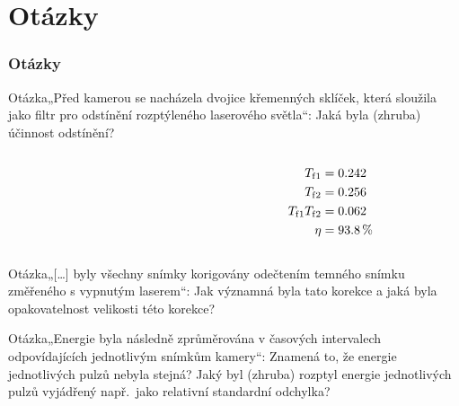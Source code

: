 \documentclass[10pt]{beamer}
\begin{document}
\part{Otázky}
\section{Otázky}
\newcommand\question[1]{\begin{block}{Otázka}#1\end{block}}
\begin{frame}
	\partpage
\end{frame}

\begin{frame}
	\question{„Před kamerou se nacházela dvojice křemenných sklíček, která
		sloužila jako filtr pro odstínění rozptýleného laserového světla“:
		Jaká byla (zhruba) účinnost odstínění?}
	\begin{columns}
	\begin{column}{0.75\textwidth}
		
	\end{column}
	\begin{column}{0.25\textwidth}
		\begin{align*}
			T_\text{f}{}_1 &= \num{0.242} \\
			T_\text{f}{}_2 &= \num{0.256} \\
			T_\text{f}{}_1 T_\text{f}{}_2 &= \num{0.062} \\
			\eta &= \SI{93.8}{\percent}
		\end{align*}
	\end{column}
	\end{columns}
\end{frame}

\begin{frame}
	\question{„[\ldots] byly všechny snímky korigovány odečtením temného
		snímku změřeného s vypnutým laserem“:
		Jak významná byla tato korekce a jaká byla opakovatelnost
		velikosti této korekce?}
\end{frame}

\begin{frame}
	\question{„Energie byla následně zprůměrována v časových intervalech
		odpovídajících jednotlivým snímkům kamery“:
		Znamená to, že energie jednotlivých pulzů nebyla stejná?
		Jaký byl (zhruba) rozptyl energie jednotlivých pulzů vyjádřený
		např.~jako relativní standardní odchylka?}
\end{frame}
\end{document}
